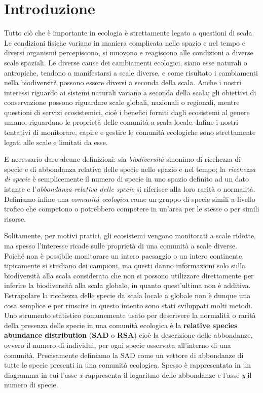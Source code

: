 \chapter*{Introduzione}
Tutto ciò che è importante in ecologia è strettamente legato a questioni di scala\cite{doi:10.1111/2041-210X.12319}. Le condizioni fisiche variano in maniera complicata nello spazio e nel tempo e diversi organismi percepiscono, si muovono e reagiscono alle condizioni a diverse scale spaziali. 
Le diverse cause dei cambiamenti ecologici, siano esse naturali o antropiche, tendono a manifestarsi a scale diverse, e come risultato i cambiamenti nella biodiversità possono essere diversi a seconda della scala. Anche i nostri interessi riguardo ai sistemi naturali variano a seconda della scala; gli obiettivi di conservazione possono riguardare scale globali, nazionali o regionali, mentre questioni di servizi ecosistemici, cioè i benefici forniti dagli ecosistemi al genere umano, riguardano le proprietà delle comunità a scala locale. Infine i nostri tentativi di monitorare, capire e gestire le comunità ecologiche sono strettamente legati alle scale e limitati da esse.

E necessario dare alcune definizioni: sia \emph{biodiversità} sinonimo di ricchezza di specie e di abbondanza relativa delle specie nello spazio e nel tempo; la \emph{ricchezza di specie} è semplicemente il numero di specie in uno spazio definito ad un dato istante e l'\emph{abbondanza relativa delle specie} si riferisce alla loro rarità o normalità. Definiamo infine una \emph{comunità ecologica} come un gruppo di specie simili a livello trofico che competono o potrebbero competere in un'area per le stesse o per simili risorse. 
 
Solitamente, per motivi pratici, gli ecosistemi vengono monitorati a scale ridotte, ma spesso l'interesse ricade sulle proprietà di una comunità a scale diverse.
Poiché non è possibile monitorare un intero paesaggio o un intero continente, tipicamente si studiano dei campioni, ma questi danno informazioni solo sulla biodiversità alla scala considerata che non si possono utilizzare direttamente per inferire la biodiversità alla scala globale, in quanto quest'ultima non è additiva. Estrapolare la ricchezza delle specie da scala locale a globale non è dunque una cosa semplice e per riuscire in questo intento sono stati sviluppati molti metodi. Uno strumento statistico comunemente usato per descrivere la normalità o rarità della presenza delle specie in una comunità ecologica è la \textbf{relative species abundance distribution} (\textbf{SAD} o \textbf{RSA}) cioè la descrizione delle abbondanze, ovvero il numero di individui, per ogni specie osservata all'interno di una comunità\cite{doi:McGill2007}. Precisamente definiamo la SAD come un vettore di abbondanze di tutte le specie presenti in una comunità ecologica. Spesso è rappresentata in un diagramma in cui l'asse \emph{x} rappresenta il logaritmo delle abbondanze e l'asse \emph{y} il numero di specie\cite{Preston}.

